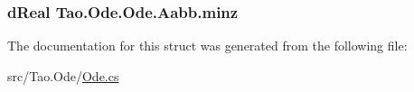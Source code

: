 \label{struct_tao_1_1_ode_1_1_ode_1_1_aabb_ad894fc0972b1910203f6ab71c3f07f36}
\hypertarget{struct_tao_1_1_ode_1_1_ode_1_1_aabb_aaf7537c3877c100d2cf857b04d1b9eb2}{
\subsubsection[{minz}]{\setlength{\rightskip}{0pt plus 5cm}dReal {\bf Tao.Ode.Ode.Aabb.minz}}}
\label{struct_tao_1_1_ode_1_1_ode_1_1_aabb_aaf7537c3877c100d2cf857b04d1b9eb2}


The documentation for this struct was generated from the following file:\begin{DoxyCompactItemize}
\item 
src/Tao.Ode/\hyperlink{_ode_8cs}{Ode.cs}\end{DoxyCompactItemize}
